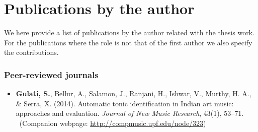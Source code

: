 \newcommand\contrib[1]{\\~{\footnotesize (#1)}}
% 
\newcommand\resource[2]{
	\noindent #1 \par
	\vspace{0.2em}
	{\centering	\url{#2} \par}
	\vspace{0.5em}
	\hrule \par 
	\vspace{0.8em} \par}
%
%
\chapter[Publications by the author][Publications by the author]{Publications by the author}\label{app:mypapers}%

We here provide a list of publications by the author related with the thesis work. For the publications where the role is not that of the first author we  also specify the contributions. 

\subsection*{Peer-reviewed journals}
\begin{itemize}[leftmargin=*]
	\item \textbf{Gulati, S.}, Bellur, A., Salamon, J., Ranjani, H., Ishwar, V., Murthy, H. A., \& Serra, X. (2014). Automatic tonic identification in Indian art music: approaches and evaluation. \textit{Journal of New Music Research}, 43(1), 53–71.
	\contrib{Companion webpage: \url{http://compmusic.upf.edu/node/323}}
\end{itemize}
%
